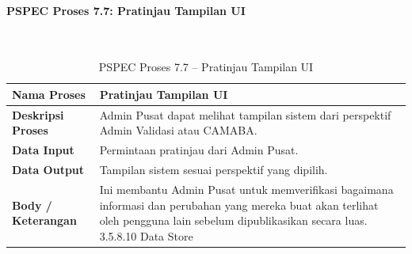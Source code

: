 \paragraph{PSPEC Proses 7.7: Pratinjau Tampilan UI}~\\
\begin{longtable}{|p{}|p{}|}
	\caption{PSPEC Proses 7.7 -- Pratinjau Tampilan UI}
	\label{table:3.pspec77}\\
	\hline
	\textbf{Nama Proses} & Pratinjau Tampilan UI \\
	\hline
	\textbf{Deskripsi Proses} & Admin Pusat dapat melihat tampilan sistem dari perspektif Admin Validasi atau CAMABA. \\
	\hline
	\textbf{Data Input} & Permintaan pratinjau dari Admin Pusat. \\
	\hline
	\textbf{Data Output} & Tampilan sistem sesuai perspektif yang dipilih. \\
	\hline
	\textbf{Body / Keterangan} & Ini membantu Admin Pusat untuk memverifikasi bagaimana informasi dan perubahan yang mereka buat akan terlihat oleh pengguna lain sebelum dipublikasikan secara luas. 3.5.8.10 Data Store \\
	\hline
\end{longtable}

